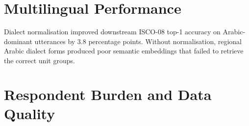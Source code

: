 \section{Multilingual Performance}
\label{sec:res-multilingual}

\begin{table}[htbp]
\centering
\caption{Language identification and code-switching detection results.}
\label{tab:ch6-multilingual}
\small\renewcommand{\arraystretch}{1.35}
\end{table}

Dialect normalisation improved downstream ISCO-08 top-1 accuracy on
Arabic-dominant utterances by 3.8 percentage points.
Without normalisation, regional Arabic dialect forms produced poor semantic embeddings
that failed to retrieve the correct unit groups.

\section{Respondent Burden and Data Quality}
\label{sec:res-burden}

